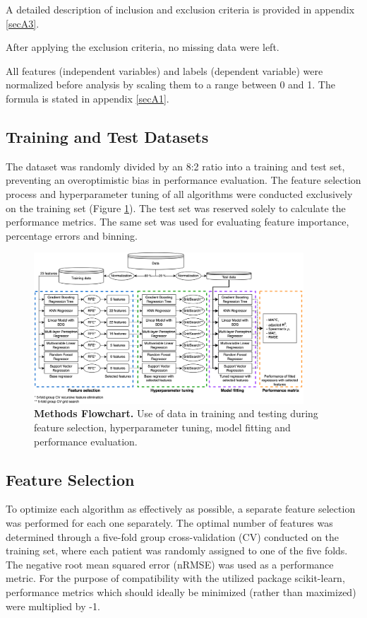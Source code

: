 \documentclass[referee,lineno,pdflatex,sn-nature]{sn-jnl}%
\theoremstyle{thmstyleone}%
\theoremstyle{thmstyletwo}%
\theoremstyle{thmstylethree}%
\begin{document}
A detailed description of inclusion and exclusion criteria is provided in appendix \ref{secA3}.

After applying the exclusion criteria, no missing data were left.

All features (independent variables) and labels (dependent variable) were normalized before analysis by scaling them to a range between 0 and 1. The formula is stated in appendix \ref{secA1}. 

\subsection{Training and Test Datasets}\label{sec2.2}
The dataset was randomly divided by an 8:2 ratio into a training and test set, preventing an overoptimistic bias in performance evaluation. The feature selection process and hyperparameter tuning of all algorithms were conducted exclusively on the training set (Figure \ref{fig1}). The test set was reserved solely to calculate the performance metrics. The same set was used for evaluating feature importance, percentage errors and binning.

\begin{figure}[h]
\centering
\includegraphics[width=0.9\textwidth]{images/Figure1.png}
\caption{\textbf{Methods Flowchart.} Use of data in training and testing during feature selection, hyperparameter tuning, model fitting and performance evaluation.}\label{fig1}
\end{figure}

\subsection{Feature Selection}\label{sec2.3}
To optimize each algorithm as effectively as possible, a separate feature selection was performed for each one separately. The optimal number of features was determined through a five-fold group cross-validation (CV) conducted on the training set, where each patient was randomly assigned to one of the five folds. The negative root mean squared error (nRMSE) was used as a performance metric. For the purpose of compatibility with the utilized package scikit-learn, performance metrics which should ideally be minimized (rather than maximized) were multiplied by -1. 
\end{document}
